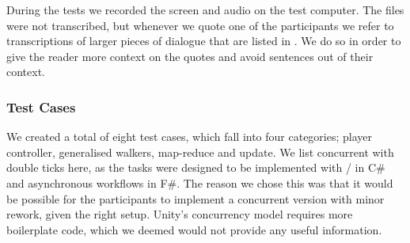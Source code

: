 During the tests we recorded the screen and audio on the test computer. The files were not transcribed, but whenever we quote one of the participants we refer to transcriptions of larger pieces of dialogue that are listed in . We do so in order to give the reader more context on the quotes and avoid  sentences out of their context.

\subsubsection{Test Cases} \label{sec:usability:test:cases}
We created a total of eight test cases, which fall into four categories; player controller, generalised walkers, map-reduce and  update. We list concurrent with double ticks here, as the tasks were designed to be implemented with / in C\# and asynchronous workflows in F\#. The reason we chose this was that it would be possible for the participants to implement a concurrent version with minor rework, given the right setup. Unity's concurrency model requires more boilerplate code, which we deemed would not provide any useful information.

